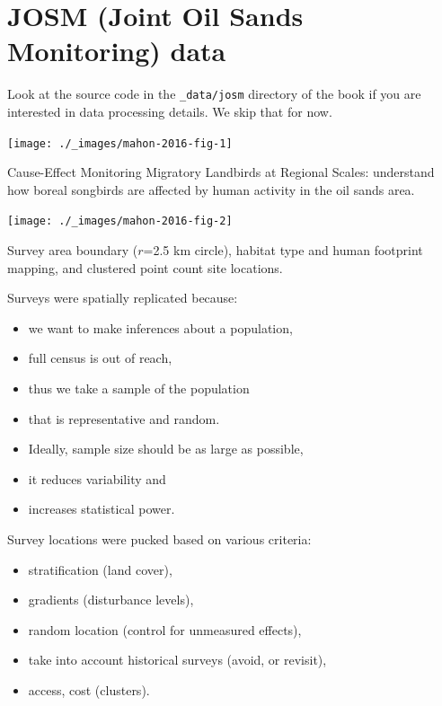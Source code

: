 \documentclass[12pt,]{scrbook}
\providecommand{\tightlist}{%
  \setlength{\itemsep}{0pt}\setlength{\parskip}{0pt}}
\begin{document}
\hypertarget{josm-joint-oil-sands-monitoring-data}{%
\section{JOSM (Joint Oil Sands Monitoring) data}\label{josm-joint-oil-sands-monitoring-data}}

Look at the source code in the \texttt{\_data/josm} directory of the book
if you are interested in data processing details.
We skip that for now.

\texttt{[image: ./\_images/mahon-2016-fig-1]}

Cause-Effect Monitoring Migratory Landbirds at Regional Scales:
understand how boreal songbirds are affected by human activity in the oil sands area.

\texttt{[image: ./\_images/mahon-2016-fig-2]}

Survey area boundary (\(r\)=2.5 km circle), habitat type and human footprint mapping,
and clustered point count site locations.

Surveys were spatially replicated because:

\begin{itemize}
\tightlist
\item
  we want to make inferences about a population,
\item
  full census is out of reach,
\item
  thus we take a sample of the population
\item
  that is representative and random.
\item
  Ideally, sample size should be as large as possible,
\item
  it reduces variability and
\item
  increases statistical power.
\end{itemize}

Survey locations were pucked based on various criteria:

\begin{itemize}
\tightlist
\item
  stratification (land cover),
\item
  gradients (disturbance levels),
\item
  random location (control for unmeasured effects),
\item
  take into account historical surveys (avoid, or revisit),
\item
  access, cost (clusters).
\end{itemize}
\end{document}
